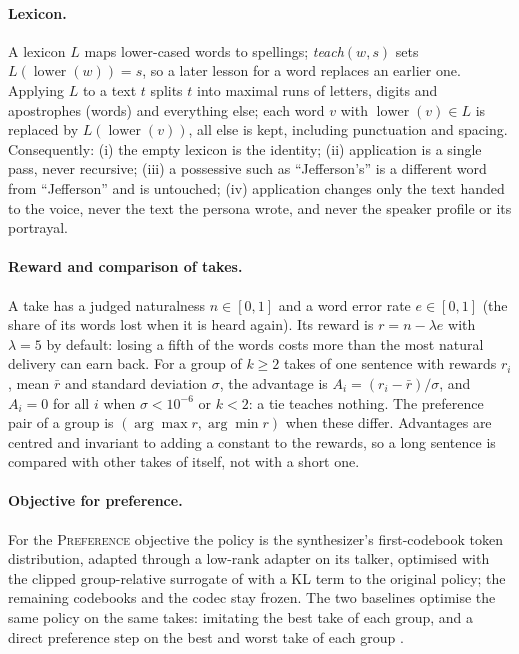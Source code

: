 \paragraph{Lexicon.}
A lexicon $L$ maps lower-cased words to spellings; \emph{teach}$(w,s)$ sets $L(\operatorname{lower}(w))=s$, so a later lesson for
a word replaces an earlier one. Applying $L$ to a text $t$ splits $t$ into maximal runs of letters, digits
and apostrophes (words) and everything else; each word $v$ with $\operatorname{lower}(v)\in L$ is replaced by
$L(\operatorname{lower}(v))$, all else is kept, including punctuation and spacing. Consequently:
(i) the empty lexicon is the identity; (ii) application is a single pass, never recursive; (iii) a possessive such as
``Jefferson's'' is a different word from ``Jefferson'' and is untouched; (iv) application changes only the text handed to
the voice, never the text the persona wrote, and never the speaker profile or its portrayal.

\paragraph{Reward and comparison of takes.}
A take has a judged naturalness $n\in[0,1]$ and a word error rate $e\in[0,1]$ (the share of its words lost when it is heard
again). Its reward is $r=n-\lambda e$ with $\lambda=5$ by default: losing a fifth of the words costs more than the most natural
delivery can earn back. For a group of $k\ge2$ takes of one sentence with rewards $r_i$, mean $\bar r$ and standard deviation
$\sigma$, the advantage is $A_i=(r_i-\bar r)/\sigma$, and $A_i=0$ for all $i$ when $\sigma<10^{-6}$ or $k<2$: a tie teaches
nothing. The preference pair of a group is $(\arg\max r,\arg\min r)$ when these differ. Advantages are centred and invariant
to adding a constant to the rewards, so a long sentence is compared with other takes of itself, not with a short one.

\paragraph{Objective for preference.}
For the \textsc{Preference} objective the policy is the synthesizer's first-codebook token distribution, adapted through a low-rank adapter on its
talker, optimised with the clipped group-relative surrogate of \citet{shao2024deepseekmath} with a KL term to the original policy; the remaining codebooks and the codec stay frozen.
The two baselines optimise the same policy on the same takes: imitating the best take of each group, and a direct preference step on the best and worst take of each group \citep{rafailov2023dpo}.
